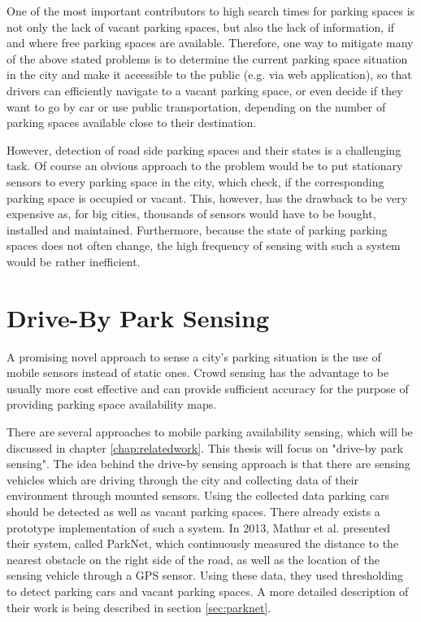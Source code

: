 One of the most important contributors to high search times for parking spaces is not only the lack of vacant parking spaces, but also the lack of information, if and where free parking spaces are available. Therefore, one way to mitigate many of the above stated problems is to determine the current parking space situation in the city and make it accessible to the public (e.g. via web application), so that drivers can efficiently navigate to a vacant parking space, or even decide if they want to go by car or use public transportation, depending on the number of parking spaces available close to their destination. 

However, detection of road side parking spaces and their states is a challenging task. Of course an obvious approach to the problem would be to put stationary sensors to every parking space in the city, which check, if the corresponding parking space is occupied or vacant. This, however, has the drawback to be very expensive as, for big cities, thousands of sensors would have to be bought, installed and maintained. Furthermore, because the state of parking parking spaces does not often change, the high frequency of sensing with such a system would be rather inefficient.



\section{Drive-By Park Sensing}

A promising novel approach to sense a city's parking situation is the use of mobile sensors instead of static ones. Crowd sensing has the advantage to be usually more cost effective and can provide sufficient accuracy for the purpose of providing parking space availability maps.

There are several approaches to mobile parking availability sensing, which will be discussed in chapter \ref{chap:relatedwork}. This thesis will focus on "drive-by park sensing". The idea behind the drive-by sensing approach is that there are sensing vehicles which are driving through the city and collecting data of their environment through mounted sensors. Using the collected data parking cars should be detected as well as vacant parking spaces. There already exists a prototype implementation of such a system. In 2013, Mathur et al. \cite{Mathur:2010:PDS:1814433.1814448} presented their system, called ParkNet, which continuously measured the distance to the nearest obstacle on the right side of the road, as well as the location of the sensing vehicle through a GPS sensor. Using these data, they used thresholding to detect parking cars and vacant parking spaces. A more detailed description of their work is being described in section \ref{sec:parknet}.

